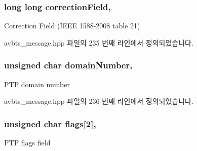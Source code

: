 \subsubsection[{\texorpdfstring{correction\+Field}{correctionField}}]{\setlength{\rightskip}{0pt plus 5cm}long long correction\+Field\hspace{0.3cm}{\ttfamily [protected]}, {\ttfamily [inherited]}}\hypertarget{class_p_t_p_message_common_a635b707dac6610b5b159be5c8ec1891e}{}\label{class_p_t_p_message_common_a635b707dac6610b5b159be5c8ec1891e}
Correction Field (I\+E\+EE 1588-\/2008 table 21) 

avbts\+\_\+message.\+hpp 파일의 235 번째 라인에서 정의되었습니다.

\subsubsection[{\texorpdfstring{domain\+Number}{domainNumber}}]{\setlength{\rightskip}{0pt plus 5cm}unsigned char domain\+Number\hspace{0.3cm}{\ttfamily [protected]}, {\ttfamily [inherited]}}\hypertarget{class_p_t_p_message_common_a0443527ff087aecea2cac4f6e84d189c}{}\label{class_p_t_p_message_common_a0443527ff087aecea2cac4f6e84d189c}
P\+TP domain number 

avbts\+\_\+message.\+hpp 파일의 236 번째 라인에서 정의되었습니다.

\subsubsection[{\texorpdfstring{flags}{flags}}]{\setlength{\rightskip}{0pt plus 5cm}unsigned char flags\mbox{[}2\mbox{]}\hspace{0.3cm}{\ttfamily [protected]}, {\ttfamily [inherited]}}\hypertarget{class_p_t_p_message_common_a8c2f6104634deb80d932fa0cd9166fba}{}\label{class_p_t_p_message_common_a8c2f6104634deb80d932fa0cd9166fba}
P\+TP flags field 

